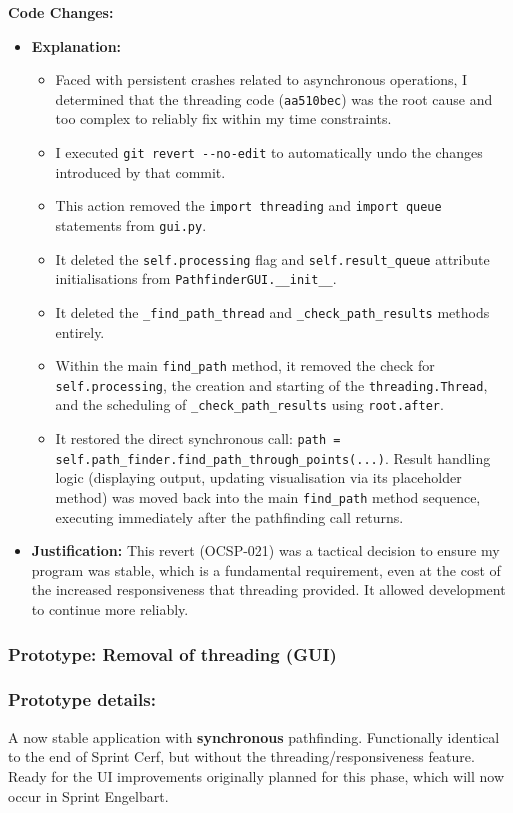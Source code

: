 	\textbf{Code Changes:}
	\begin{itemize}
		\item \textbf{Explanation:}
		\begin{itemize}
			\item Faced with persistent crashes related to asynchronous operations, I determined that the threading code (\verb|aa510bec|) was the root cause and too complex to reliably fix within my time constraints.
			\item I executed \verb|git revert --no-edit| to automatically undo the changes introduced by that commit.
			\item This action removed the \verb|import threading| and \verb|import queue| statements from \verb|gui.py|.
			\item It deleted the \verb|self.processing| flag and \verb|self.result_queue| attribute initialisations from \verb|PathfinderGUI.__init__|.
			\item It deleted the \verb|_find_path_thread| and \verb|_check_path_results| methods entirely.
			\item Within the main \verb|find_path| method, it removed the check for \verb|self.processing|, the creation and starting of the \verb|threading.Thread|, and the scheduling of \verb|_check_path_results| using \verb|root.after|.
			\item It restored the direct synchronous call: \verb|path = self.path_finder.find_path_through_points(...)|. Result handling logic (displaying output, updating visualisation via its placeholder method) was moved back into the main \verb|find_path| method sequence, executing immediately after the pathfinding call returns.
		\end{itemize}
		\item \textbf{Justification:} This revert (OCSP-021) was a tactical decision to ensure my program was stable, which is a fundamental requirement, even at the cost of the increased responsiveness that threading provided. It allowed development to continue more reliably.
	\end{itemize}
	
\subsubsection*{Prototype: Removal of threading (GUI)}



\subsubsection{Prototype details:}
A now stable application with \textbf{synchronous} pathfinding. Functionally identical to the end of Sprint Cerf, but without the threading/responsiveness feature. Ready for the UI improvements originally planned for this phase, which will now occur in Sprint Engelbart.

